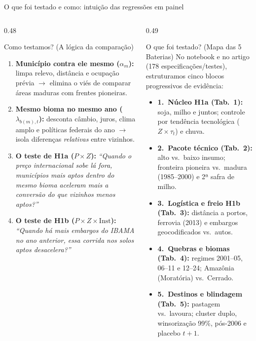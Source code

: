 \documentclass[aspectratio=169,10.5pt]{beamer}
\newcommand{\fonte}[1]{\par\vspace{1mm}{\fontsize{6.5}{7.5}\selectfont\color{gray}Fonte: #1\par}}
\begin{document}
\begin{frame}{O que foi testado e como: intuição das regressões em painel}
\begin{columns}[T]
\begin{column}{0.48\textwidth}
\begin{block}{Como testamos? (A lógica da comparação)}
\fontsize{7.5}{9.2}\selectfont
\begin{enumerate}
    \setlength{\itemsep}{0.9mm}
    \item \textbf{Município contra ele mesmo ($\alpha_m$):} limpa relevo, distância e ocupação prévia $\rightarrow$ elimina o viés de comparar áreas maduras com frentes pioneiras.
    \item \textbf{Mesmo bioma no mesmo ano ($\lambda_{b(m),t}$):} desconta câmbio, juros, clima amplo e políticas federais do ano $\rightarrow$ isola diferenças \textit{relativas} entre vizinhos.
    \item \textbf{O teste de H1a ($P \times Z$):} \textit{``Quando o preço internacional sobe lá fora, municípios mais aptos dentro do mesmo bioma aceleram mais a conversão do que vizinhos menos aptos?''}
    \item \textbf{O teste de H1b ($P \times Z \times \text{Inst}$):} \textit{``Quando há mais embargos do IBAMA no ano anterior, essa corrida nos solos aptos desacelera?''}
\end{enumerate}
\end{block}
\end{column}

\begin{column}{0.49\textwidth}
\begin{block}{O que foi testado? (Mapa das 5 Baterias)}
\fontsize{7.5}{9.2}\selectfont
No notebook e no artigo (178 especificações/testes), estruturamos cinco blocos progressivos de evidência:
\vspace{0.8mm}
\begin{itemize}
    \setlength{\itemsep}{0.8mm}
    \item \textbf{1.\ Núcleo H1a (Tab.\ 1):} soja, milho e juntos; controle por tendência tecnológica ($Z \times \tau_t$) e chuva.
    \item \textbf{2.\ Pacote técnico (Tab.\ 2):} alto vs.\ baixo insumo; fronteira pioneira vs.\ madura (1985--2000) e 2ª safra de milho.
    \item \textbf{3.\ Logística e freio H1b (Tab.\ 3):} distância a portos, ferrovia (2013) e embargos geocodificados vs.\ autos.
    \item \textbf{4.\ Quebras e biomas (Tab.\ 4):} regimes 2001--05, 06--11 e 12--24; Amazônia (Moratória) vs.\ Cerrado.
    \item \textbf{5.\ Destinos e blindagem (Tab.\ 5):} pastagem vs.\ lavoura; cluster duplo, winsorização 99\%, pós-2006 e placebo $t+1$.
\end{itemize}
\end{block}
\end{column}
\end{columns}
\end{frame}
\end{document}
